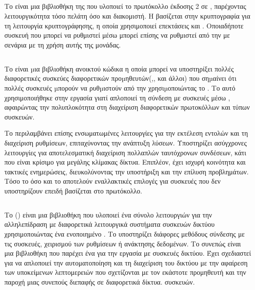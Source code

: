 \subsection{}
Το  είναι μια βιβλιοθήκη της  που υλοποιεί το πρωτόκολλο  έκδοσης 2 σε , παρέχοντας λειτουργικότητα τόσο πελάτη όσο και διακομιστή.
Η  βασίζεται στην κρυπτογραφία για τη λειτουργία κρυπτογράφησης, η οποία χρησιμοποιεί επεκτάσεις  και .
Οποιαδήποτε συσκευή που μπορεί να ρυθμιστεί μέσω  μπορεί επίσης να ρυθμιστεί από την  με σενάρια με τη χρήση αυτής της μονάδας.

\subsection{}
Το  είναι µια βιβλιοθήκη  ανοικτού κώδικα η οποία μπορεί να υποστηρίξει πολλές 
διαφορετικές συσκεύες διαφορετικών προµηθευτών(,, και άλλοι) που σηµαίνει ότι πολλές συσκευές µπορούν 
να ρυθµιστούν από την  χρησιµοποιώντας το . 
Το  αυτό χρησιμοποιήθηκε στην εργασία γιατί απλοποιεί τη σύνδεση με συσκευές μέσω , αφαιρώντας την πολυπλοκότητα στη διαχείριση διαφορετικών πρωτοκόλλων και 
τύπων συσκευών.


Το  περιλαμβάνει επίσης ενσωματωμένες λειτουργίες για την εκτέλεση εντολών και τη διαχείριση ρυθμίσεων, επιταχύνοντας την ανάπτυξη λύσεων.
Υποστηρίζει ασύγχρονες λειτουργίες για αποτελεσματική διαχείριση πολλαπλών ταυτόχρονων συνδέσεων, κάτι που είναι κρίσιμο για μεγάλης κλίμακας δίκτυα. Επιπλέον, έχει ισχυρή 
κοινότητα και τακτικές ενημερώσεις, διευκολύνοντας την υποστήριξη και την επίλυση προβλημάτων.
Τόσο το  όσο και το  αποτελούν εναλλακτικές επιλογές για συσκευές που δεν υποστηρίζουν  επειδή βασίζεται στο  πρωτόκολλο.


\subsection{}
Το  () είναι μια βιβλιοθήκη  που υλοποιεί ένα σύνολο λειτουργιών για την αλληλεπίδραση με διαφορετικά λειτουργικά συστήματα συσκευών δικτύου χρησιμοποιώντας ένα ενοποιημένο .
Το  υποστηρίζει διάφορες μεθόδους σύνδεσης με τις συσκευές, χειρισμού των ρυθμίσεων ή ανάκτησης δεδομένων. Το  συνεπώς είναι μια βιβλιοθήκη  που παρέχει ένα 
 για την εργασία με συσκευές δικτύου. Έχει σχεδιαστεί για να απλοποιεί την
αυτοματοποίηση και τη διαχείριση του δικτύου με την αφαίρεση των υποκείμενων λεπτομερειών που σχετίζονται με τον εκάστοτε προμηθευτή και την παροχή μιας συνεπούς διεπαφής σε διαφορετικά δίκτυα. 
συσκευών.


